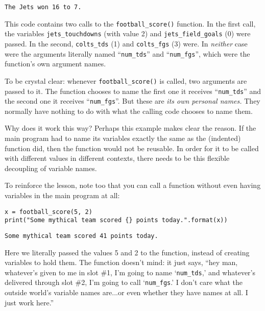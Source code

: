 \begin{Verbatim}[fontsize=\small,samepage=true,frame=leftline,framesep=5mm,framerule=1mm]
The Jets won 16 to 7.
\end{Verbatim}

This code contains two calls to the \texttt{football\_score()} function. In the
first call, the variables \texttt{jets\_touchdowns} (with value 2) and
\texttt{jets\_field\_goals} (0) were passed. In the second,
\texttt{colts\_tds} (1) and \texttt{colts\_fgs} (3) were. In
\textit{neither} case were the arguments literally named ``\texttt{num\_tds}''
and ``\texttt{num\_fgs}'', which were the function's own argument names.

To be crystal clear: whenever \texttt{football\_score()} is called, two
arguments are passed to it. The function chooses to name the first one it
receives ``\texttt{num\_tds}'' and the second one it receives
``\texttt{num\_fgs}''. But these are \textit{its own personal names.} They
normally have nothing to do with what the calling code chooses to name them.

Why does it work this way? Perhaps this example makes clear the reason. If the
main program had to name its variables exactly the same as the (indented)
function did, then the function would not be reusable. In order for it to be
called with different values in different contexts, there needs to be this
flexible decoupling of variable names.

To reinforce the lesson, note too that you can call a function without even
having variables in the main program at all:

\begin{Verbatim}[fontsize=\footnotesize,samepage=true,frame=single,framesep=3mm]
x = football_score(5, 2)
print("Some mythical team scored {} points today.".format(x))
\end{Verbatim}
\vspace{-.2in}

\begin{Verbatim}[fontsize=\small,samepage=true,frame=leftline,framesep=5mm,framerule=1mm]
Some mythical team scored 41 points today.
\end{Verbatim}

Here we literally passed the values 5 and 2 to the function, instead of
creating variables to hold them. The function doesn't mind: it just says, ``hey
man, whatever's given to me in slot \#1, I'm going to name `\texttt{num\_tds},'
and whatever's delivered through slot \#2, I'm going to call
`\texttt{num\_fgs}.' I don't care what the outside world's variable names
are...or even whether they have names at all. I just work here.''

